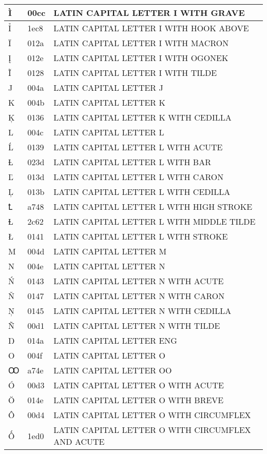 \documentclass[12pt,letterpaper,openany]{book}
\begin{document}
\begin{center}
\begin{supertabular}{|m{0.25in}|m{0.5in}|m{4in}|}
Ì & 00cc & LATIN CAPITAL LETTER I WITH GRAVE\\\hline
Ỉ & 1ec8 & LATIN CAPITAL LETTER I WITH HOOK ABOVE\\\hline
Ī & 012a & LATIN CAPITAL LETTER I WITH MACRON\\\hline
Į & 012e & LATIN CAPITAL LETTER I WITH OGONEK\\\hline
Ĩ & 0128 & LATIN CAPITAL LETTER I WITH TILDE\\\hline
J & 004a & LATIN CAPITAL LETTER J\\\hline
K & 004b & LATIN CAPITAL LETTER K\\\hline
Ķ & 0136 & LATIN CAPITAL LETTER K WITH CEDILLA\\\hline
L & 004c & LATIN CAPITAL LETTER L\\\hline
Ĺ & 0139 & LATIN CAPITAL LETTER L WITH ACUTE\\\hline
Ƚ & 023d & LATIN CAPITAL LETTER L WITH BAR\\\hline
Ľ & 013d & LATIN CAPITAL LETTER L WITH CARON\\\hline
Ļ & 013b & LATIN CAPITAL LETTER L WITH CEDILLA\\\hline
Ꝉ & a748 & LATIN CAPITAL LETTER L WITH HIGH STROKE\\\hline
Ɫ & 2c62 & LATIN CAPITAL LETTER L WITH MIDDLE TILDE\\\hline
Ł & 0141 & LATIN CAPITAL LETTER L WITH STROKE\\\hline
M & 004d & LATIN CAPITAL LETTER M\\\hline
N & 004e & LATIN CAPITAL LETTER N\\\hline
Ń & 0143 & LATIN CAPITAL LETTER N WITH ACUTE\\\hline
Ň & 0147 & LATIN CAPITAL LETTER N WITH CARON\\\hline
Ņ & 0145 & LATIN CAPITAL LETTER N WITH CEDILLA\\\hline
Ñ & 00d1 & LATIN CAPITAL LETTER N WITH TILDE\\\hline
Ŋ & 014a & LATIN CAPITAL LETTER ENG\\\hline
O & 004f & LATIN CAPITAL LETTER O\\\hline
Ꝏ & a74e & LATIN CAPITAL LETTER OO\\\hline
Ó & 00d3 & LATIN CAPITAL LETTER O WITH ACUTE\\\hline
Ŏ & 014e & LATIN CAPITAL LETTER O WITH BREVE\\\hline
Ô & 00d4 & LATIN CAPITAL LETTER O WITH CIRCUMFLEX\\\hline
Ố & 1ed0 & LATIN CAPITAL LETTER O WITH CIRCUMFLEX AND ACUTE\\\hline

\end{supertabular}
\end{center}
\end{document}

